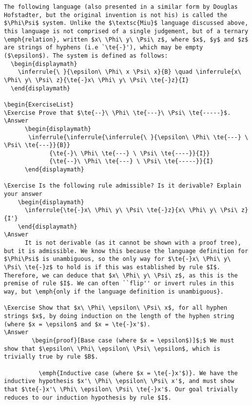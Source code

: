 \documentclass{book}
\begin{document}
\begin{verbatim}
The following language (also presented in a similar form by Douglas Hofstadter, but the original invention is not his) is called the $\Phi\Psi$ system. Unlike the $\textsc{Miu}$ language discussed above, this language is not comprised of a single judgement, but of a ternary \emph{relation}, written $x\ \Phi\ y\ \Psi\ z$, where $x$, $y$ and $z$ are strings of hyphens (i.e `\te{-}'), which may be empty ($\epsilon$). The system is defined as follows:
  \begin{displaymath}
    \inferrule{\ }{\epsilon\ \Phi\ x \Psi\ x}{B} \quad \inferrule{x\ \Phi\ y\ \Psi\ z}{\te{-}x\ \Phi\ y\ \Psi\ \te{-}z}{I}
  \end{displaymath}

\begin{ExerciseList}
\Exercise Prove that $\te{--}\ \Phi\ \te{---}\ \Psi\ \te{-----}$.
\Answer
      \begin{displaymath}
       \inferrule{\inferrule{\inferrule{\ }{\epsilon\ \Phi\ \te{---} \ \Psi\ \te{---}}{B}}
             {\te{-}\ \Phi\ \te{---} \ \Psi\ \te{----}}{I}}
             {\te{--}\ \Phi\ \te{---} \ \Psi\ \te{-----}}{I}
      \end{displaymath}

\Exercise Is the following rule admissible? Is it derivable? Explain your answer
    \begin{displaymath}
      \inferrule{\te{-}x\ \Phi\ y\ \Psi\ \te{-}z}{x\ \Phi\ y\ \Psi\ z}{I'}
    \end{displaymath}
\Answer
      It is not derivable (as it cannot be shown with a proof tree), but it is admissible. We know this because the language definition for $\Phi\Psi$ is unambiguous, so the only way for $\te{-}x\ \Phi\ y\ \Psi\ \te{-}z$ to hold is if this was established by rule $I$. Therefore, we can deduce that $x\ \Phi\ y\ \Psi\ z$, as this is the premise of rule $I$. We can often ``flip'' or invert rules in this way, but \emph{only if the language definition is unambiguous}.

\Exercise Show that $x\ \Phi\ \epsilon\ \Psi\ x$, for all hyphen strings $x$, by doing induction on the length of the hyphen string (where $x = \epsilon$ and $x = \te{-}x'$).
\Answer
        \begin{proof}[Base case (where $x = \epsilon$)]$;$ We must show that $\epsilon\ \Phi\ \epsilon\ \Psi\ \epsilon$, which is trivially true by rule $B$.
          
          \emph{Inductive case (where $x = \te{-}x'$)}. We have the inductive hypothesis $x'\ \Phi\ \epsilon\ \Psi\ x'$, and must show that $\te{-}x'\ \Phi\ \epsilon\ \Psi\ \te{-}x'$. Our goal trivially reduces to our induction hypothesis by rule $I$.
          

\end{verbatim}
\end{document}
